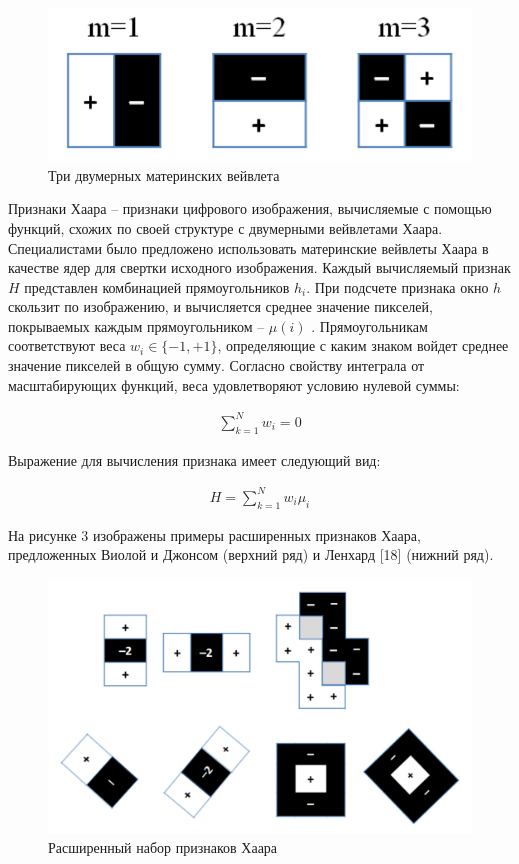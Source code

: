 \documentclass[a4paper, 12pt]{article}		%
\begin{document}
\begin{figure}[h!]
\centering
\includegraphics[scale=0.6]{res/pic002}
\caption{Три двумерных материнских вейвлета}
\end{figure}

Признаки Хаара -- признаки цифрового изображения, вычисляемые с помощью функций, схожих по своей структуре с двумерными вейвлетами Хаара. Специалистами было предложено использовать материнские вейвлеты Хаара в качестве ядер для свертки исходного изображения. Каждый вычисляемый признак $H$ представлен комбинацией прямоугольников $h_i$. При подсчете признака окно $h$ скользит по изображению, и вычисляется среднее значение пикселей, покрываемых каждым прямоугольником -- $\mu(i)$ . Прямоугольникам соответствуют веса $w_i \in \{−1, +1\}$, определяющие с каким знаком войдет среднее значение пикселей в общую сумму. Согласно свойству интеграла от масштабирующих функций, веса удовлетворяют условию нулевой суммы:

\begin{gather}
\sum\limits_{k=1}^N w_i=0
\end{gather}

Выражение для вычисления признака имеет следующий вид:

\begin{gather}
H = \sum\limits_{k=1}^N w_i \mu_i
\end{gather}

На рисунке 3 изображены примеры расширенных признаков Хаара, предложенных Виолой и Джонсом (верхний ряд) и Ленхард [18] (нижний ряд).

\begin{figure}[h!]
\centering
\includegraphics[scale=0.45]{res/pic003}
\caption{Расширенный набор признаков Хаара}
\end{figure}
\end{document}
